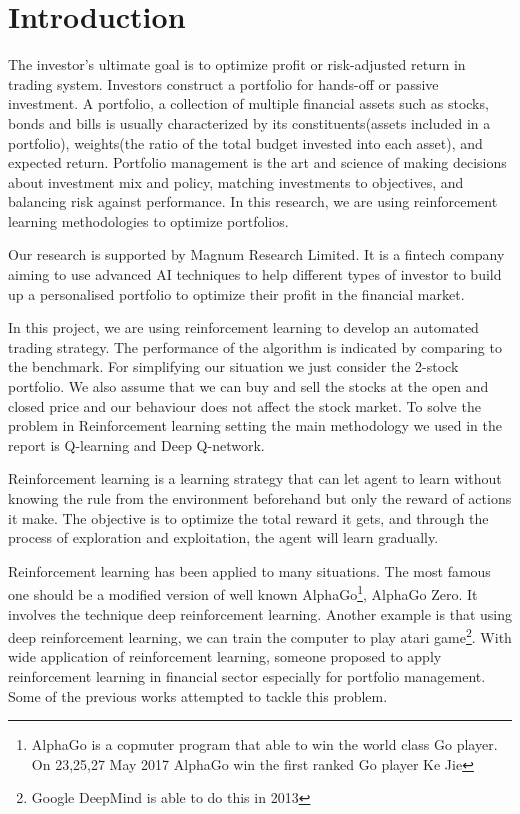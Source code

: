 \chapter{Introduction}\label{Ch:Introduction}

The investor’s ultimate goal is to optimize profit or risk-adjusted return in trading system. Investors construct a portfolio for hands-off or passive investment. A portfolio, a collection of multiple financial assets such as stocks, bonds and bills is usually characterized by its constituents(assets included in a portfolio), weights(the ratio of the total budget invested into each asset), and expected return. Portfolio management is the art and science of making decisions about investment mix and policy, matching investments to objectives, and balancing risk against performance. In this research, we are using reinforcement learning methodologies to optimize portfolios. 

Our research is supported by Magnum Research Limited. It is a fintech company aiming to use advanced AI techniques to help different types of investor to build up a personalised portfolio to optimize their profit in the financial market.

In this project, we are using reinforcement learning to develop an automated trading strategy. The performance of the algorithm is indicated by comparing to the benchmark. For simplifying our situation we just consider the 2-stock portfolio. We also assume that we can buy and sell the stocks at the open and closed price and our behaviour does not affect the stock market. To solve the problem in Reinforcement learning setting the main methodology we used in the report is Q-learning and Deep Q-network. 

Reinforcement learning is a learning strategy that can let agent to learn without knowing the rule from the environment beforehand but only the reward of actions it make. The objective is to optimize the total reward it gets, and through the process of exploration and exploitation, the agent will learn gradually.

Reinforcement learning has been applied to many situations. The most famous one should be a modified version of well known AlphaGo\footnote{AlphaGo is a copmuter program that able to win the world class Go player. On 23,25,27 May 2017 AlphaGo win the first ranked Go player Ke Jie}, AlphaGo Zero. It involves the technique deep reinforcement learning. Another example is that using deep reinforcement learning, we can train the computer to play atari game\footnote{Google DeepMind is able to do this in 2013}. With wide application of reinforcement learning, someone proposed to apply reinforcement learning in financial sector especially for portfolio management. Some of the previous works attempted to tackle this problem.